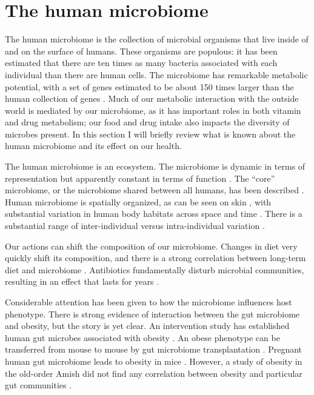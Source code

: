 \documentclass{amsart}
\begin{document}
\section{The human microbiome}
The human microbiome is the collection of microbial organisms that live inside of and on the surface of humans.
These organisms are populous: it has been estimated that there are ten times as many bacteria associated with each individual than there are human cells.
The microbiome has remarkable metabolic potential, with a set of genes estimated to be about 150 times larger than the human collection of genes \citep{qin2010human}.
Much of our metabolic interaction with the outside world is mediated by our microbiome, as it has important roles in both vitamin
and drug \citep{maurice2013xenobiotics} metabolism; our food and drug intake also impacts the diversity of microbes present.
In this section I will briefly review what is known about the human microbiome and its effect on our health.

The human microbiome is an ecosystem.
The microbiome is dynamic in terms of representation but apparently constant in terms of function \citep{hmp2012structure}.
The ``core'' microbiome, or the microbiome shared between all humans, has been described \citep{turnbaugh2008core}.
Human microbiome is spatially organized, as can be seen on skin \citep{grice2009topographical}, with substantial variation in human body habitats across space and time \citep{costello2009bacterial}.
There is a substantial range of inter-individual versus intra-individual variation \citep{hmp2012structure}.

Our actions can shift the composition of our microbiome.
Changes in diet very quickly shift its composition, and there is a strong correlation between long-term diet and microbiome \citep{li2009human,wu2011linking}.
Antibiotics fundamentally disturb microbial communities, resulting in an effect that lasts for years \citep{jernberg2007long,dethlefsen2008pervasive,jakobsson2010short,dethlefsen2011incomplete}.

Considerable attention has been given to how the microbiome influences host phenotype.
There is strong evidence of interaction between the gut microbiome and obesity, but the story is yet clear.
An intervention study has established human gut microbes associated with obesity \citep{ley2006microbial}.
An obese phenotype can be transferred from mouse to mouse by gut microbiome transplantation \citep{turnbaugh2006obesity}.
Pregnant human gut microbiome leads to obesity in mice \citep{koren2012host}.
However, a study of obesity in the old-order Amish did not find any correlation between obesity and particular gut communities \citep{zupancic2012analysis}.
\end{document}
